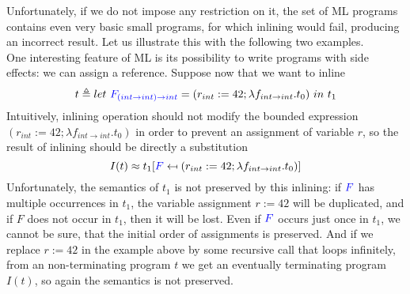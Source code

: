 \documentclass[a4paper,11pt,oneside]{article}
\theoremstyle{plain}
\newcommand{\tmlet}[3]{let~#1=#2~in~#3}
\newcommand{\tmsbst}[3]{#1 [#2 \mapsfrom #3] }
\begin{document}
 Unfortunately, if we do not impose any restriction on it, the set of ML programs contains even very basic small programs, for which inlining would fail, producing an incorrect result. 
 Let us illustrate this with the following two examples. \\

One interesting feature of ML is its possibility to write programs with side
effects: we can assign a reference. Suppose now that we want to inline
	$$ t \triangleq 
	\tmlet 
            {\textcolor{blue}
            {F_{(int \rightarrow int) \rightarrow int}}}
	{(r_{int}:= 42; \lambda f_{int \rightarrow int}. t_0)}{t_1} $$
Intuitively, inlining operation should not modify the bounded expression
$(r_{int}:= 42; \lambda f_{int \rightarrow int}. t_0)$ in order to prevent an
assignment of variable $r$, so the result of inlining should be directly a
substitution
	$$ I(t) \approx 
	\tmsbst{t_1}
		{\textcolor{blue}{F}}
		{(r_{int}:= 42; \lambda f_{int \rightarrow int}. t_0)} $$ 
	Unfortunately, the semantics of $t_1$ is not preserved by this inlining: if
$\textcolor{blue}{F}$ has multiple occurrences in $t_1$, the variable
assignment $r:=42$ will be duplicated, and if $F$ does not occur in $t_1$,
then it will be lost. 
	Even if $\textcolor{blue}{F}$ occurs just once in
$t_1$, we cannot be sure, that the initial order of assignments is
preserved.
 	And if we replace $r:=42$ in the example above by some recursive
call that loops infinitely, from an non-terminating program $t$ we get an eventually
terminating program $I(t)$, so again the semantics is not preserved. \\
\end{document}
